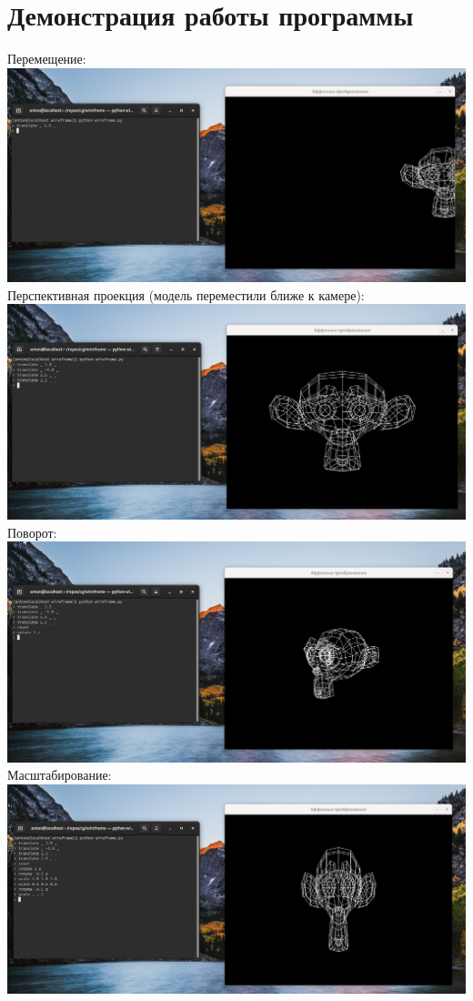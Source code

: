 \documentclass[a4paper,12pt]{article}
\begin{document}
\section{\normalsize{Демонстрация работы программы}}
\begin{flushleft}
  Перемещение:
  \includegraphics{translation.png}
  Перспективная проекция (модель переместили ближе к камере):
  \includegraphics{perspective.png}
  Поворот:
  \includegraphics{rotation.png}
  Масштабирование:
  \includegraphics{scale.png}

\end{flushleft}
\end{document}
